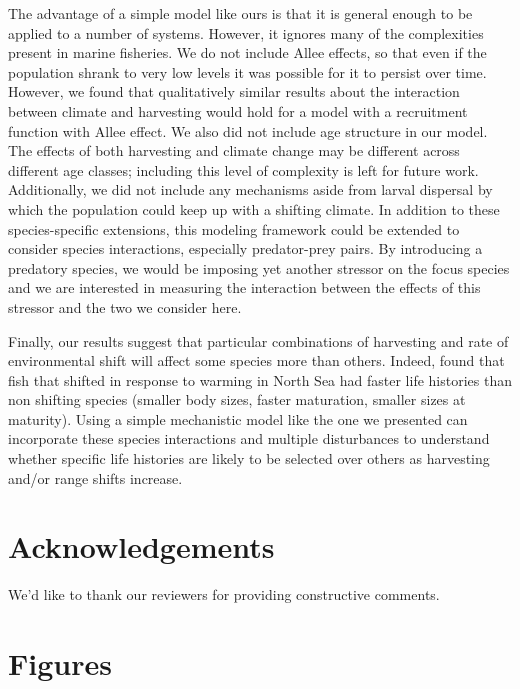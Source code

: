 \documentclass[12pt,english]{article}
\begin{document}
\begin{spacing}{1.9}
\begin{flushleft}
The advantage of a simple model like ours is that it is general enough to be applied to a number of systems.  However, it  ignores many of the complexities present in marine fisheries. We do not include Allee effects, so that even if the population shrank to very low levels it was possible for it to persist over time. However, we found that qualitatively similar results about the interaction between climate and harvesting would hold for a model with a recruitment function with Allee effect. We also did not include age structure in our model. The effects of both harvesting and climate change may be different across different age classes; including this level of complexity is left for future work. Additionally, we did not include any mechanisms aside from larval dispersal by which the population could keep up with a shifting climate.  In addition to these species-specific extensions, this modeling framework could be extended to consider species interactions, especially predator-prey pairs.  By introducing a predatory species, we would be imposing yet another stressor on the focus species \citep{Lingetal2009, Gurevitchetal2000}and we are interested in measuring the interaction between the effects of this stressor and the two we consider here.

Finally, our results suggest that particular combinations of harvesting and rate of environmental shift will affect some species more than others. Indeed, \citet{Perryetal2005} found that fish that shifted in response to warming in North Sea had faster life histories than non shifting species (smaller body sizes, faster maturation, smaller sizes at maturity). Using a simple mechanistic model like the one we presented can incorporate these species interactions and multiple disturbances to understand whether specific life histories are likely to be selected over others as harvesting and/or range shifts increase.

\section{ Acknowledgements}
We'd like to thank our reviewers for providing constructive comments. 



\section{Figures}


\end{flushleft}
\end{spacing}
\end{document}
